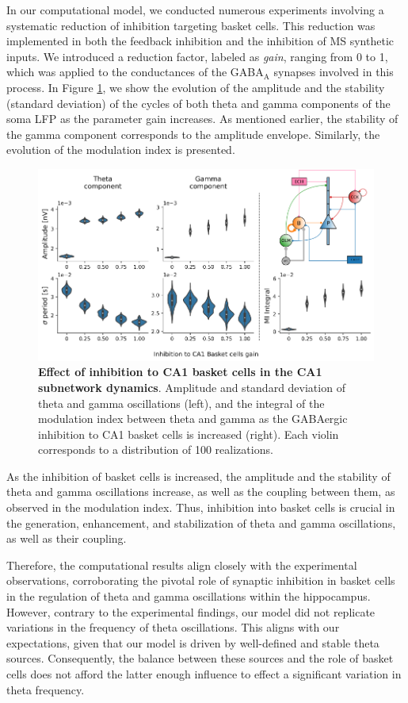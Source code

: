\documentclass[../main.tex]{subfiles}
\begin{document}
In our computational model, we conducted numerous experiments involving a systematic reduction of inhibition targeting basket cells.
This reduction was implemented in both the feedback inhibition and the inhibition of MS synthetic inputs.
We introduced a reduction factor, labeled as \textit{gain}, ranging from 0 to 1, which was applied to the conductances of the GABA$_\text{A}$ synapses involved in this process.
In Figure \ref{fig:CA1basket-deshibition}, we show the evolution of the amplitude and the stability (standard deviation) of the cycles of both theta and gamma components of the soma LFP as the parameter gain increases.
As mentioned earlier, the stability of the gamma component corresponds to the amplitude envelope.
Similarly, the evolution of the modulation index is presented.
\begin{figure}[!htb]
    \centering
    \includegraphics[width=\textwidth]{chapter4/figures/CA1basket_desinhibition.png}
    \caption{\textbf{Effect of inhibition to CA1 basket cells in the CA1 subnetwork dynamics}.
    Amplitude and standard deviation of theta and gamma oscillations (left), and the integral of the modulation index between theta and gamma as the GABAergic inhibition to CA1 basket cells is increased (right).
    Each violin corresponds to a distribution of 100 realizations.}
    \label{fig:CA1basket-deshibition}
\end{figure}
As the inhibition of basket cells is increased, the amplitude and the stability of theta and gamma oscillations increase, as well as the coupling between them, as observed in the modulation index.
Thus, inhibition into basket cells is crucial in the generation, enhancement, and stabilization of theta and gamma oscillations, as well as their coupling.

Therefore, the computational results align closely with the experimental observations, corroborating the pivotal role of synaptic inhibition in basket cells in the regulation of theta and gamma oscillations within the hippocampus.
However, contrary to the experimental findings, our model did not replicate variations in the frequency of theta oscillations. 
This aligns with our expectations, given that our model is driven by well-defined and stable theta sources. Consequently, the balance between these sources and the role of basket cells does not afford the latter enough influence to effect a significant variation in theta frequency.
\end{document}
